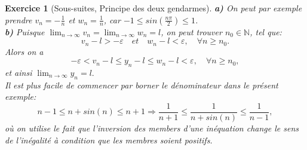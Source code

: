 \documentclass{article}
\newcommand{\Nn}{{\mathbb{N}}}
\theoremstyle{exercice}
\newtheorem{exercice}{Exercice}
\begin{document}
\begin{exercice}[Sous-suites, Principe des deux gendarmes]
\textbf{a)} On peut par exemple prendre $v_n = -\frac{1}{n}$ et $w_n = \frac{1}{n}$, car $-1 \leq sin(\frac{n \pi}{2}) \leq 1$. \\


\textbf{b)} Puisque $\lim_{n\rightarrow\infty}v_n=\lim_{n\rightarrow\infty}w_n=l$, on peut trouver $n_0\in\Nn$, tel que:
\begin{equation*}
    v_n-l>-\varepsilon \quad et \quad w_n-l<\varepsilon, \quad \forall n \geq n_0.
\end{equation*}
Alors on a 
\begin{equation*}
    -\varepsilon<v_n-l\leq y_n-l \leq w_n-l < \varepsilon, \quad \forall n \geq n_0,
\end{equation*}
et ainsi $\lim_{n\rightarrow\infty}y_n=l.  $ \\

\faLightbulbO \quad {} Il est plus facile de commencer par borner le dénominateur dans le présent exemple:
\begin{equation}
    n-1 \leq n + sin(n) \leq n+1 \Rightarrow \frac{1}{n+1} \leq \frac{1}{n + sin(n)} \leq \frac{1}{n-1},
\end{equation}
où on utilise le fait que l'inversion des members d'une inéquation change le sens de l'inégalité à condition que les membres soient positifs.

\end{exercice}
\end{document}
